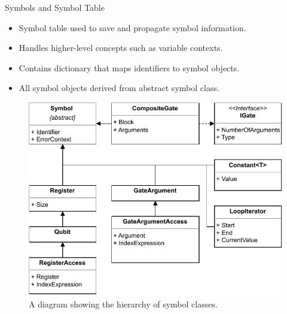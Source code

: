 \begin{frame}{Symbols and Symbol Table}
    \begin{minipage}{.45\textwidth}
        \begin{itemize}
            \item Symbol table used to save and propagate symbol information.
            \item Handles higher-level concepts such as variable contexts. %
            \item Contains dictionary that maps identifiers to symbol objects.
            \item All symbol objects derived from abstract symbol class.
        \end{itemize}    
    \end{minipage}
    \begin{minipage}{.50\textwidth}
        \centering
        \begin{figure}[htp]
            \centering
            \includegraphics[]{../figures/drawio/slides/uml_symbols.pdf}
            \caption{A diagram showing the hierarchy of symbol classes.}
        \end{figure}
    \end{minipage}
\end{frame}

